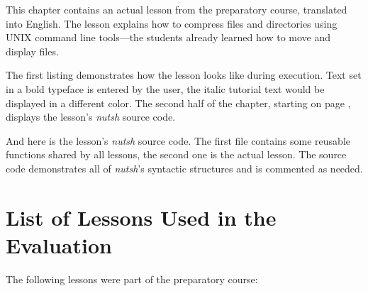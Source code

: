 \documentclass[paper=a4,abstract=on,cleardoublepage=empty,numbers=noenddot,toc=bib,12pt,appendixprefix=true]{scrreprt}
\begin{document}
This chapter contains an actual lesson from the preparatory course, translated into English. The lesson explains how to compress files and directories using UNIX command line tools---the students already learned how to move and display files.

The first listing demonstrates how the lesson looks like during execution. Text set in a bold typeface is entered by the user, the italic tutorial text would be displayed in a different color. The second half of the chapter, starting on page , displays the lesson's \emph{nutsh} source code.


%
And here is the lesson's \emph{nutsh} source code. The first file contains some reusable functions shared by all lessons, the second one is the actual lesson. The source code demonstrates all of \emph{nutsh}'s syntactic structures and is commented as needed.

\label{lst:compress}




\chapter{List of Lessons Used in the Evaluation}
\label{sec:lessons}

The following lessons were part of the preparatory course:
\end{document}

